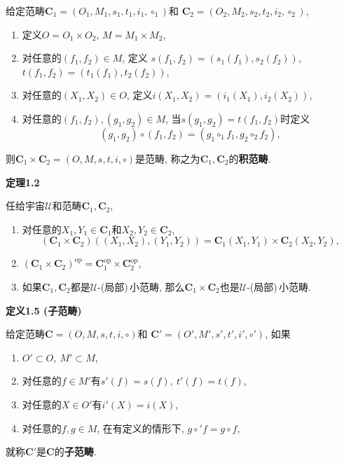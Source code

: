 \documentclass[UTF8]{ctexart}
\begin{document}
给定范畴$\mathbf{C}_1=(O_1,M_1,s_1,t_1,i_1,\circ_1)$和
$\mathbf{C}_2=(O_2,M_2,s_2,t_2,i_2,\circ_2)$,
\begin{enumerate}
    \item 定义$O=O_1\times O_2$, $M=M_1\times M_2$,
    \item 对任意的$(f_1,f_2)\in M$, 定义
    $s(f_1,f_2)=(s_1(f_1),s_2(f_2))$, $t(f_1,f_2)=(t_1(f_1),t_2(f_2))$,
    \item 对任意的$(X_1,X_2)\in O$, 定义$i(X_1,X_2)=(i_1(X_1),i_2(X_2))$,
    \item 对任意的$(f_1,f_2),(g_1,g_2)\in M$, 当$s(g_1,g_2)=t(f_1,f_2)$时定义
    \[
        (g_1,g_2)\circ(f_1,f_2)=(g_1\circ_1f_1,g_2\circ_2f_2),
    \]
\end{enumerate}
则$\mathbf{C}_1\times\mathbf{C}_2=(O,M,s,t,i,\circ)$是范畴,
称之为$\mathbf{C}_1,\mathbf{C}_2$的\textbf{积范畴}.

\vspace{10pt}

\hypertarget{sec:定理1.2}{}
\noindent\textbf{定理1.2}

任给宇宙$\mathcal{U}$和范畴$\mathbf{C}_1,\mathbf{C}_2$,
\begin{enumerate}
    \item 对任意的$X_1,Y_1\in\mathbf{C}_1$和$X_2,Y_2\in\mathbf{C}_2$,
    \vspace{-3pt}
    \[
        (\mathbf{C}_1\times\mathbf{C}_2)((X_1,X_2),(Y_1,Y_2))=
        \mathbf{C}_1(X_1,Y_1)\times\mathbf{C}_2(X_2,Y_2),
    \]
    \item $(\mathbf{C}_1\times\mathbf{C}_2)^{\mathrm{op}}=
    \mathbf{C}_1^{\mathrm{op}}\times\mathbf{C}_2^{\mathrm{op}}$,
    \item 如果$\mathbf{C}_1,\mathbf{C}_2$都是$\mathcal{U}$-(局部)\,\!小范畴,
    那么$\mathbf{C}_1\times\mathbf{C}_2$也是$\mathcal{U}$-(局部)\,\!小范畴.
\end{enumerate}

\vspace{10pt}

\hypertarget{sec:定义1.5}{}
\noindent\textbf{定义1.5 (子范畴)}

给定范畴$\mathbf{C}=(O,M,s,t,i,\circ)$和
$\mathbf{C}'=(O',M',s',t',i',\circ')$, 如果
\begin{enumerate}
    \item $O'\subset O,\ M'\subset M$,
    \item 对任意的$f\in M'$有$s'(f)=s(f),\ t'(f)=t(f)$,
    \item 对任意的$X\in O'$有$i'(X)=i(X)$,
    \item 对任意的$f,g\in M$, 在有定义的情形下, $g\circ'f=g\circ f$,
\end{enumerate}
就称$\mathbf{C}'$是$\mathbf{C}$的\textbf{子范畴}.
\end{document}
